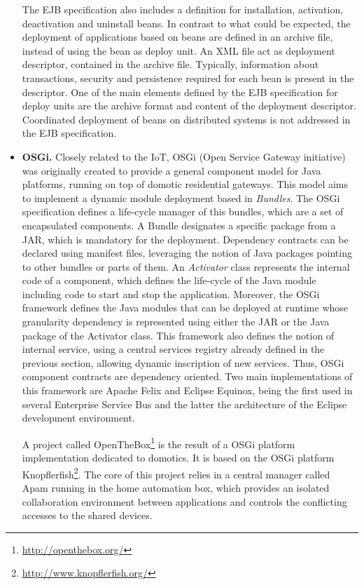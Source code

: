 \begin{itemize}
	The EJB specification also includes a definition for installation, activation, deactivation and uninstall beans.
	In contrast to what could be expected, the deployment of applications based on beans are defined in an archive file, instead of using the bean as deploy unit.
	An XML file act as deployment descriptor, contained in the archive file.
	Typically, information about transactions, security and persistence required for each bean is present in the descriptor.
	One of the main elements defined by the EJB specification for deploy units are the archive format and content of the deployment descriptor.
	Coordinated deployment of beans on distributed systems is not addressed in the EJB specification.

	\item \textbf{OSGi.} Closely related to the IoT, OSGi (Open Service Gateway initiative) was originally created to provide a general component model for Java platforms, running on top of domotic residential gateways.
	This model aims to implement a dynamic module deployment based in \textit{Bundles}.
	The OSGi specification defines a life-cycle manager of this bundles, which are a set of encapsulated components.
	A Bundle designates a specific package from a JAR, which is mandatory for the deployment.
	Dependency contracts can be declared using manifest files, leveraging the notion of Java packages pointing to other bundles or parts of them.
	An \textit{Activator} class represents the internal code of a component, which defines the life-cycle of the Java module including code to start and stop the application.
	Moreover, the OSGi framework defines the Java modules that can be deployed at runtime whose granularity dependency is represented using either the JAR or the Java package of the Activator class.
	This framework also defines the notion of internal service, using a central services registry already defined in the previous section, allowing dynamic inscription of new services.
	Thus, OSGi component contracts are dependency oriented.
	Two main implementations of this framework are Apache Felix and Eclipse Equinox, being the first used in several Enterprise Service Bus and the latter the architecture of the Eclipse development environment.
	
	A project called OpenTheBox\footnote{\url{http://openthebox.org/}} is the result of a OSGi platform implementation dedicated to domotics.
	It is based on the OSGi platform Knopflerfish\footnote{\url{http://www.knopflerfish.org/}}.
	The core of this project relies in a central manager called Apam\cite{damou2013apam} running in the home automation box, which provides an isolated collaboration environment between applications\cite{estublier2012managing} and controls the conflicting accesses to the shared devices\cite{estublier2013resource}.
	

\end{itemize}
